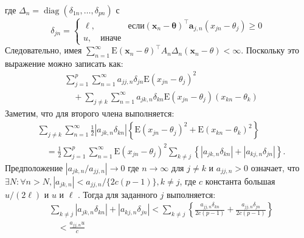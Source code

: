 где $\Delta_{n}=\operatorname{diag}\left(\delta_{1 n}, \ldots, \delta_{p n}\right)$ с
\begin{equation}
    \delta_{j n}= \begin{cases}
        \ell, & \text{если} \left(\mathbf{x}_{n}-\boldsymbol{\theta}\right)^{\top} \mathbf{a}_{j, n}\left(x_{j n}-\theta_{j}\right) \geq 0  \\
        u,\quad \text{иначе}
    \end{cases}
\end{equation}
Следовательно, имея $\sum_{n=1}^{\infty} \mathrm{E}\left(\mathbf{x}_{n}-\theta\right)^{\top} A_{n} \Delta_{n}\left(\mathbf{x}_{n}-\theta\right)<\infty$. 
Поскольку это выражение можно записать как:
\begin{align*}
    & \sum_{j=1}^{p} \sum_{n=1}^{\infty} a_{j j, n} \delta_{j n} \mathrm{E}\left(x_{j n}-\theta_{j}\right)^{2} \\
    & \quad+\sum_{j \neq k} \sum_{n=1}^{\infty} a_{j k, n} \delta_{k n} \mathrm{E}\left(x_{j n}-\theta_{j}\right)\left(x_{k n}-\theta_{k}\right) \tag{A2}
\end{align*}
Заметим, что для второго члена выполняется:
\begin{equation}
    \begin{aligned}
        & \sum_{j \neq k} \sum_{n=1}^{\infty} \frac{1}{2}\left|a_{j k, n} \delta_{k n}\right|\left\{\mathrm{E}\left(x_{j n}-\theta_{j}\right)^{2}+\mathrm{E}\left(x_{k n}-\theta_{k}\right)^{2}\right\} \\
        & \quad=\frac{1}{2} \sum_{j=1}^{p} \sum_{n=1}^{\infty} \mathrm{E}\left(x_{j n}-\theta_{j}\right)^{2} \sum_{k \neq j}\left\{\left|a_{j k, n} \delta_{k n}\right|+\left|a_{k j, n} \delta_{j n}\right|\right\} .
    \end{aligned}
\end{equation}
Предположение $\left|a_{j k, n} / a_{j j, n}\right| \rightarrow 0$ где $n \rightarrow \infty$ для $j \neq k$ и $a_{j j, n}>0$
означает, что $\exists N: \forall n>N,\left|a_{j k, n}\right|<a_{j j, n} /\{2 c(p-1)\}, k \neq j$, 
где $c$ константа большая $u /(2 \ell)$ и $u$ и $\ell$ . Тогда для заданного $j$ выполняется:
\begin{equation}
    \begin{aligned}
        & \sum_{k \neq j}\left|a_{j k, n} \delta_{k n}\right|+\left|a_{k j, n} \delta_{j n}\right|<\sum_{k \neq j}\left\{\frac{a_{j j, n} \delta_{k n}}{2 c(p-1)}+\frac{a_{j j, n} \delta_{j n}}{2 c(p-1)}\right\} \\
        & \quad<\frac{a_{j j, n} u}{c}
    \end{aligned}  
\end{equation}
